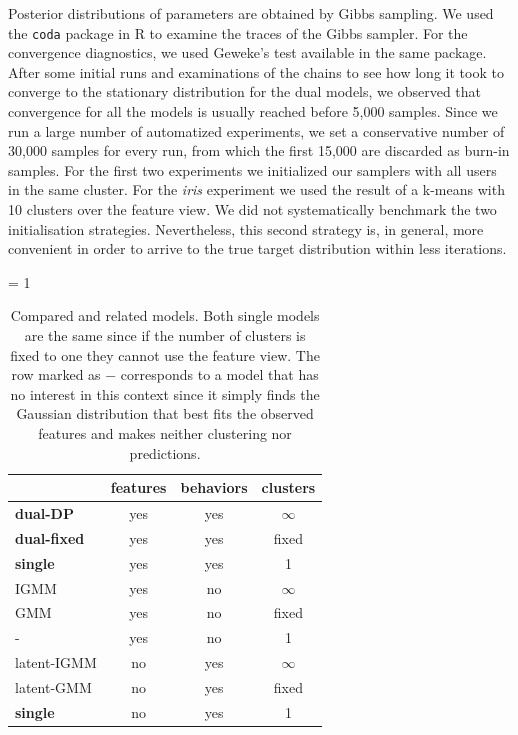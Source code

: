 \documentclass[smallextended]{svjour3}          %
\begin{document}
Posterior distributions of parameters are obtained by Gibbs sampling. We used the \texttt{coda} package in R \citep{coda} to examine the traces of the Gibbs sampler. For the convergence diagnostics, we used Geweke's test available in the same package. After some initial runs and examinations of the chains to see how long it took to converge to the stationary distribution for the dual models, we observed that convergence for all the models is usually reached before 5,000 samples. Since we run a large number of automatized experiments, we set a conservative number of 30,000 samples for every run, from which the first 15,000 are discarded as burn-in samples. 
For the first two experiments we initialized our samplers with all users in the same cluster. For the \textit{iris} experiment we used the result of a k-means with 10 clusters over the feature view. We did not systematically benchmark the two initialisation strategies. Nevertheless, this second strategy is, in general, more convenient in order to arrive to the true target distribution within less iterations.
\begin{table}[ht]
\caption{Compared and related models. Both single models are the same since if the number of clusters is fixed to one they cannot use the feature view. The row marked as $-$ corresponds to a model that has no interest in this context since it simply finds the Gaussian distribution that best fits the observed features and makes neither clustering nor predictions.} 
 \begin{center}
   \tabcolsep = 1\tabcolsep
   \begin{tabular}{lccc}
   \hline\hline
                & features & behaviors & clusters\\
   \hline
   \textbf{dual-DP}    & yes & yes   & $\infty$\\
   \textbf{dual-fixed} & yes & yes   & fixed   \\
   \textbf{single}     & yes & yes   & 1 \\
   IGMM     & yes & no    & $\infty$ \\
   GMM        & yes & no    & fixed \\
   -          & yes & no    & 1 \\
   latent-IGMM & no  & yes   & $\infty$ \\
   latent-GMM    & no  & yes   & fixed \\
   \textbf{single}     & no  & yes   & 1 \\   
   \hline
   \end{tabular}
\label{tab:models}
 \end{center}
\end{table}
\end{document}
